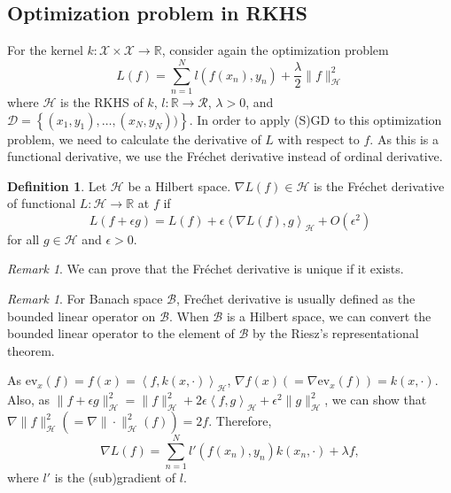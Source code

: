 \documentclass{amsart}
\theoremstyle{definition}
\newtheorem{definition}[theorem]{Definition}
\theoremstyle{remark}
\newtheorem{remark}[theorem]{Remark}
\numberwithin{equation}{section}
\begin{document}
\subsection{Optimization problem in RKHS}

For the kernel $k:\mathcal{X}\times \mathcal{X}\to \mathbb{R}$, consider again the optimization problem
\begin{equation}
L(f) = \sum_{n=1}^{N} l(f(x_n), y_n) + \frac{\lambda}{2} \|f\|_{\mathcal{H}}^2
\end{equation}
where $\mathcal{H}$ is the RKHS of $k$, $l:\mathbb{R}\to \mathcal{R}$, $\lambda > 0$, and $\mathcal{D}=\left\{(x_1, y_1), \ldots, (x_N, y_N))\right\}$.
In order to apply (S)GD to this optimization problem,
we need to calculate the derivative of $L$ with respect to $f$.
As this is a functional derivative, we use the Fr\'echet derivative instead of ordinal derivative.

\begin{definition}
Let $\mathcal{H}$ be a Hilbert space.
$\nabla L(f) \in \mathcal{H}$ is the Fr\'echet derivative of functional $L:\mathcal{H}\to \mathbb{R}$ at $f$ if 
\begin{equation}
L(f + \epsilon g) = L(f) + \epsilon \left<\nabla L(f), g\right>_\mathcal{H} + O(\epsilon^2)
\end{equation}
for all $g\in \mathcal{H}$ and $\epsilon > 0$.
\begin{remark}
We can prove that the Fr\'echet derivative is unique if it exists.
\end{remark}
\begin{remark}
For Banach space $\mathcal{B}$, Fre\'chet derivative is usually defined as the bounded linear operator on $\mathcal{B}$.
When $\mathcal{B}$ is a Hilbert space, we can convert the bounded linear operator to the element of $\mathcal{B}$ by the Riesz's representational theorem.
\end{remark}
\end{definition}

As $\mathrm{ev}_x(f) = f(x) = \left<f, k(x, \cdot) \right>_\mathcal{H}$, 
$\nabla f(x) \left( = \nabla \mathrm{ev}_x(f) \right) = k(x, \cdot)$.
Also, as $\|f + \epsilon g\|^2_{\mathcal{H}} = \|f\|_\mathcal{H}^2 + 2\epsilon \left<f, g\right>_\mathcal{H} + \epsilon^2\|g\|_\mathcal{H}^2$,  we can show that $\nabla \|f\|_\mathcal{H}^2 \left( = \nabla \|\cdot\|_\mathcal{H}^2 (f)\right) = 2f$.
Therefore,
\begin{equation}
\nabla L(f) = \sum_{n=1}^N l'(f(x_n), y_n)k(x_n, \cdot) + \lambda f,
\end{equation}
where $l'$ is the (sub)gradient of $l$.
\end{document}
